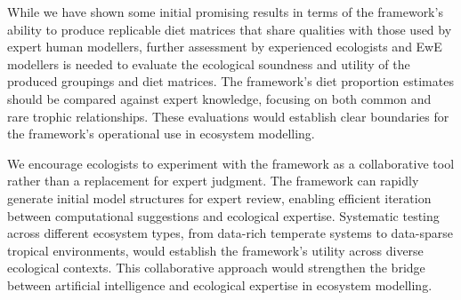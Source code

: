 While we have shown some initial promising results in terms of the framework's ability to produce replicable diet matrices that share qualities with those used by expert human modellers, further assessment by experienced ecologists and EwE modellers is needed to evaluate the ecological soundness and utility of the produced groupings and diet matrices. The framework's diet proportion estimates should be compared against expert knowledge, focusing on both common and rare trophic relationships. These evaluations would establish clear boundaries for the framework's operational use in ecosystem modelling.

We encourage ecologists to experiment with the framework as a collaborative tool rather than a replacement for expert judgment. The framework can rapidly generate initial model structures for expert review, enabling efficient iteration between computational suggestions and ecological expertise. Systematic testing across different ecosystem types, from data-rich temperate systems to data-sparse tropical environments, would establish the framework's utility across diverse ecological contexts. This collaborative approach would strengthen the bridge between artificial intelligence and ecological expertise in ecosystem modelling.
